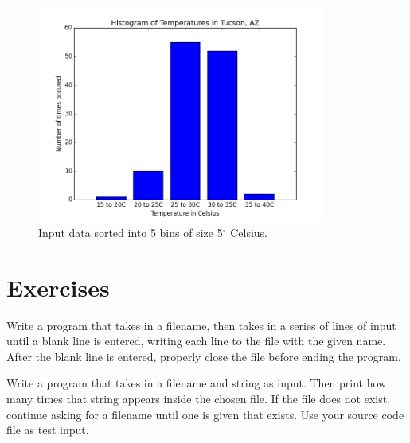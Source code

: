 \documentclass[11pt]{cselabheader}
\begin{document}
\begin{figure}[h]
  \centering
  \includegraphics[width=0.85\textwidth]{img/lab6_histo_tucson.png}
  \caption{Input data sorted into 5 bins of size 5$^\circ$ Celsius.}
  \label{fig:bar1}
\end{figure}

\pagebreak
\section{Exercises}
\label{sec:ex}

\begin{ex}[save.py] Write a program that takes in a filename, then takes in
  a series of lines of input until a blank line is entered, writing each line to
  the file with the given name. After the blank line is entered, properly close
  the file before ending the program.
\end{ex}

\begin{ex} Write a program that
  takes in a filename and string as input. Then print how many times that string
  appears inside the chosen file. If the file does not exist, continue asking
  for a filename until one is given that exists. Use your source code file as
  test input.
\end{ex}
\end{document}
